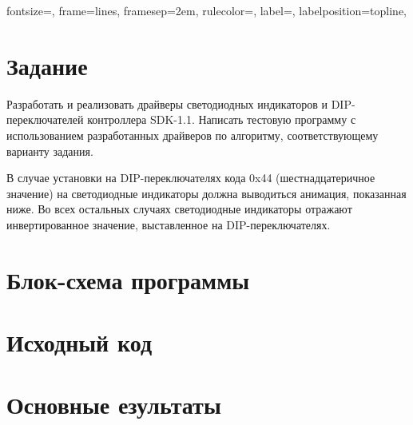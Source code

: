 
\isonefalse
\isnametrue
\def \labnum {1}
\def \labsubj {Информационно-управляющие системы}
\def \labauthor {Айтуганов Д. А. \\ Чебыкин И. Б.}
\def \labgroup {P3401}
\def \labinsp {Пинкевич В. Ю.}
\def \labname {Вариант 4}

\usepackage{graphicx,tabularx}

\usepackage{caption}
\usepackage{verbatim}
\usepackage[dvipsnames]{xcolor}

\usepackage{fancyvrb}

 {
 fontsize=\scriptsize,
 frame=lines,  %
 framesep=2em, %
 rulecolor=\color{Gray},
 label=,
 labelposition=topline,
}

\captionsetup{labelsep=period}
\pagestyle{fancy}


\section{Задание}
Разработать и реализовать драйверы светодиодных индикаторов и DIP-переключателей
контроллера SDK-1.1. Написать тестовую программу с использованием разработанных
драйверов по алгоритму, соответствующему варианту задания.

В случае установки на DIP-переключателях кода 0x44 (шестнадцатеричное значение) на
светодиодные индикаторы должна выводиться анимация, показанная ниже. Во всех
остальных случаях светодиодные индикаторы отражают инвертированное значение,
выставленное на DIP-переключателях.

\section{Блок-схема программы}
\section{Исходный код}
\section{Основные езультаты}


